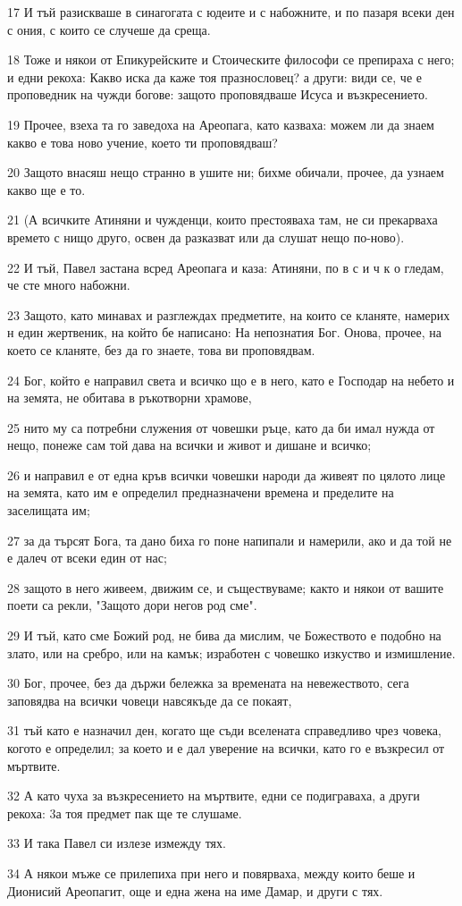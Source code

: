 \par 17 И тъй разискваше в синагогата с юдеите и с набожните, и по пазаря всеки ден с ония, с които се случеше да среща.
\par 18 Тоже и някои от Епикурейските и Стоическите философи се препираха с него; и едни рекоха: Какво иска да каже тоя празнословец? а други: види се, че е проповедник на чужди богове: защото проповядваше Исуса и възкресението.
\par 19 Прочее, взеха та го заведоха на Ареопага, като казваха: можем ли да знаем какво е това ново учение, което ти проповядваш?
\par 20 Защото внасяш нещо странно в ушите ни; бихме обичали, прочее, да узнаем какво ще е то.
\par 21 (А всичките Атиняни и чужденци, които престояваха там, не си прекарваха времето с нищо друго, освен да разказват или да слушат нещо по-ново).
\par 22 И тъй, Павел застана всред Ареопага и каза: Атиняни, по в с и ч к о гледам, че сте много набожни.
\par 23 Защото, като минавах и разглеждах предметите, на които се кланяте, намерих н един жертвеник, на който бе написано: На непознатия Бог. Онова, прочее, на което се кланяте, без да го знаете, това ви проповядвам.
\par 24 Бог, който е направил света и всичко що е в него, като е Господар на небето и на земята, не обитава в ръкотворни храмове,
\par 25 нито му са потребни служения от човешки ръце, като да би имал нужда от нещо, понеже сам той дава на всички и живот и дишане и всичко;
\par 26 и направил е от една кръв всички човешки народи да живеят по цялото лице на земята, като им е определил предназначени времена и пределите на заселищата им;
\par 27 за да търсят Бога, та дано биха го поне напипали и намерили, ако и да той не е далеч от всеки един от нас;
\par 28 защото в него живеем, движим се, и съществуваме; както и някои от вашите поети са рекли, "Защото дори негов род сме".
\par 29 И тъй, като сме Божий род, не бива да мислим, че Божеството е подобно на злато, или на сребро, или на камък; изработен с човешко изкуство и измишление.
\par 30 Бог, прочее, без да държи бележка за времената на невежеството, сега заповядва на всички човеци навсякъде да се покаят,
\par 31 тъй като е назначил ден, когато ще съди вселената справедливо чрез човека, когото е определил; за което и е дал уверение на всички, като го е възкресил от мъртвите.
\par 32 А като чуха за възкресението на мъртвите, едни се подиграваха, а други рекоха: 3а тоя предмет пак ще те слушаме.
\par 33 И така Павел си излезе измежду тях.
\par 34 А някои мъже се прилепиха при него и повярваха, между които беше и Дионисий Ареопагит, още и една жена на име Дамар, и други с тях.

